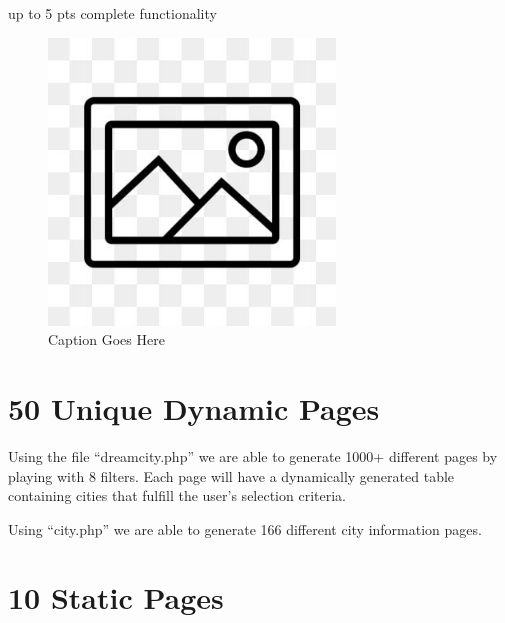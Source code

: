 \documentclass[12pt, letterpaper]{article}
\begin{document}
up to 5 pts complete functionality

\begin{figure}[htbp]
	\centering
	\includegraphics[width=3in]{images/placeholder.jpg}
	\caption{Caption Goes Here}
 \end{figure}

 \newpage


\section{50 Unique Dynamic Pages}
Using the file “dreamcity.php” we are able to generate 1000+ different pages by playing with 8 filters. Each page will have a dynamically generated table containing cities that fulfill the user’s selection criteria.

Using “city.php” we are able to generate 166 different city information pages.

\section{10 Static Pages}
\end{document}
